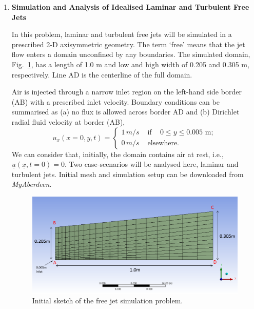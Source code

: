 \documentclass[12pts,a4paper,amsmath,amssymb,floatfix]{article}%
\renewcommand\leq{\leqslant}
\begin{document}
\begin{enumerate}[label=\bfseries Problem \arabic*:]
   \item\label{Problem1} {\bf Simulation and Analysis of Idealised Laminar and Turbulent Free Jets}

In this problem, laminar and turbulent free jets will be simulated in a prescribed 2-D axisymmetric geometry. The term `free' means that the jet flow enters a domain unconfined by any boundaries. The simulated domain, Fig.~\ref{EG501V_Assignment:Sketch1}, has a length of 1.0 m and low and high width of 0.205 and 0.305 m, respectively. Line AD is the centerline of the full domain.

Air is injected through a narrow inlet region on the left-hand side border (AB) with a prescribed inlet velocity. Boundary conditions can be summarised as (a) no flux is allowed across border AD %
and (b) Dirichlet radial fluid velocity at border (AB),
         \[ u_{x}( x=0, y, t) = \begin{cases}
             1\,m/s & \text{ if } \;\;\;0\leq y\leq 0.005 \text{ m}; \\
             0\,m/s & \text{ elsewhere.}
         \end{cases}\]
We can consider that, initially, the domain contains air at rest, i.e., $\underline{u}\left(\underline{x},t=0\right)=0$. Two case-scenarios will be analysed here, laminar and turbulent jets. Initial mesh and simulation setup can be downloaded from {\it MyAberdeen}.


\begin{figure}[h]
\begin{center}
\includegraphics[width=14.cm,height=8.cm,clip]{./Pics/free_jet_mesh.png}
\caption{Initial sketch of the free jet simulation problem. }
\label{EG501V_Assignment:Sketch1}
\end{center}
\end{figure}


\end{enumerate}
\end{document}
